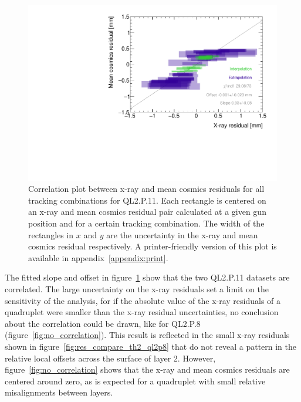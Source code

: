 \begin{figure}
    \centering
    \includegraphics[width = \textwidth]{figures/figure_QL2P11_3100V_2021-08-05_QL2P11_local_cosmic_and_xray_data_correlation_plot.pdf}
    \caption{Correlation plot between x-ray and mean cosmics residuals for all tracking combinations for QL2.P.11. Each rectangle is centered on an x-ray and mean cosmics residual pair calculated at a given gun position and for a certain tracking combination. The width of the rectangles in $x$ and $y$ are the uncertainty in the x-ray and mean cosmics residual respectively. A printer-friendly version of this plot is available in appendix~\ref{appendix:print}.}
    \label{fig:correlation}
\end{figure}

The fitted slope and offset in figure~\ref{fig:correlation} show that the two QL2.P.11 datasets are correlated. The large uncertainty on the x-ray residuals set a limit on the sensitivity of the analysis, for if the absolute value of the x-ray residuals of a quadruplet were smaller than the x-ray residual uncertainties, no conclusion about the correlation could be drawn, like for QL2.P.8 (figure~\ref{fig:no_correlation}). This result is reflected in the small x-ray residuals shown in figure~\ref{fig:res_compare_th2_ql2p8} that do not reveal a pattern in the relative local offsets across the surface of layer 2. However, figure~\ref{fig:no_correlation} shows that the x-ray and mean cosmics residuals are centered around zero, as is expected for a quadruplet with small relative misalignments between layers.

